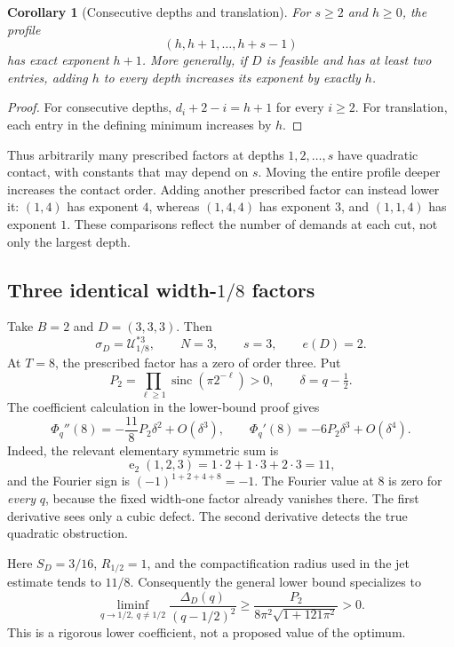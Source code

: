 \documentclass[11pt,letterpaper]{article}
\newtheorem{corollary}[theorem]{Corollary}
\theoremstyle{definition}
\theoremstyle{remark}
\newcommand{\Un}{\mathcal U}
\newcommand{\sinc}{\operatorname{sinc}}
\newcommand{\ee}{\operatorname{e}}
\begin{document}
\begin{corollary}[Consecutive depths and translation]\label{cor:translate}
For $s\ge2$ and $h\ge0$, the profile
\[
 (h,h+1,\ldots,h+s-1)
\]
has exact exponent $h+1$. More generally, if $D$ is feasible and has at least two entries, adding $h$ to every depth increases its exponent by exactly $h$.
\end{corollary}
\begin{proof}
For consecutive depths, $d_i+2-i=h+1$ for every $i\ge2$. For translation, each entry in the defining minimum increases by $h$.
\end{proof}
Thus arbitrarily many prescribed factors at depths $1,2,\ldots,s$ have quadratic contact, with constants that may depend on $s$. Moving the entire profile deeper increases the contact order. Adding another prescribed factor can instead lower it: $(1,4)$ has exponent $4$, whereas $(1,4,4)$ has exponent $3$, and $(1,1,4)$ has exponent $1$. These comparisons reflect the number of demands at each cut, not only the largest depth.

\subsection{Three identical width-\texorpdfstring{$1/8$}{1/8} factors}
Take $B=2$ and $D=(3,3,3)$. Then
\[
 \sigma_D=\Un_{1/8}^{*3},\qquad N=3,\qquad s=3,\qquad e(D)=2.
\]
At $T=8$, the prescribed factor has a zero of order three. Put
\[
 P_2=\prod_{\ell\ge1}\sinc(\pi2^{-\ell})>0,
 \qquad \delta=q-\tfrac12.
\]
The coefficient calculation in the lower-bound proof gives
\begin{equation}\label{eq:triple-example}
 \Phi_q''(8)=-\frac{11}{8}P_2\delta^2+O(\delta^3),
 \qquad
 \Phi_q'(8)=-6P_2\delta^3+O(\delta^4).
\end{equation}
Indeed, the relevant elementary symmetric sum is
\[
 \ee_2(1,2,3)=1\cdot2+1\cdot3+2\cdot3=11,
\]
and the Fourier sign is $(-1)^{1+2+4+8}=-1$. The Fourier value at $8$ is zero for \emph{every} $q$, because the fixed width-one factor already vanishes there. The first derivative sees only a cubic defect. The second derivative detects the true quadratic obstruction.

Here $S_D=3/16$, $R_{1/2}=1$, and the compactification radius used in the jet estimate tends to $11/8$. Consequently the general lower bound specializes to
\begin{equation}\label{eq:triple-lower}
 \liminf_{q\to1/2,\ q\ne1/2}
 \frac{\Delta_D(q)}{(q-1/2)^2}
 \ge \frac{P_2}{8\pi^2\sqrt{1+121\pi^2}}>0.
\end{equation}
This is a rigorous lower coefficient, not a proposed value of the optimum.
\end{document}

